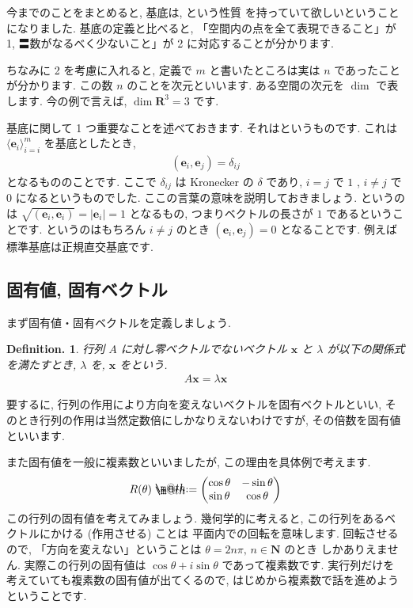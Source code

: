\documentclass[openany, a4paper, oneside]{book}
\makeatletter
\newcommand*{\defeq}{\mathrel{\rlap{%
\raisebox{0.3ex}{$\m@th\cdot$}}%
\raisebox{-0.3ex}{$\m@th\cdot$}}%
=}
\theoremstyle{break}
\theoremstyle{breakdefn}
\newtheorem{defn}[thm]{Definition.}
\makeatother
\begin{document}
今までのことをまとめると, 基底は, という性質
を持っていて欲しいということになりました. 基底の定義と比べると, 「空間内の点を全て表現できること」が 1,
〓数がなるべく少ないこと」が 2 に対応することが分かります.

ちなみに 2 を考慮に入れると, 定義で $m$ と書いたところは実は $n$ であったことが分かります.
この数 $n$ のことを次元といいます.
ある空間の次元を $\dim$ で表します. 今の例で言えば,  $\dim \bm{R}^3 =3$ です.

基底に関して 1 つ重要なことを述べておきます. それはというものです.
これは $\langle \bm{e}_{i} \rangle_{i=i}^m$ を基底としたとき,
    \begin{align}
        (\bm{e}_{i},\bm{e}_{j}) = \delta _{ij}
    \end{align}
となるもののことです. ここで $\delta _{ij}$ は Kronecker の $\delta$ であり,  $i=j$ で $1$ ,  $i \not = j$ で $0$ になるというものでした.
ここの言葉の意味を説明しておきましょう. というのは $\sqrt{(\bm{e}_{i},\bm{e}_{i})}=\mid \bm{e}_{i} \mid = 1$
となるもの, つまりベクトルの長さが $1$ であるということです. というのはもちろん $i\not = j$ のとき
 $(\bm{e}_{i},\bm{e}_{j})=0$ となることです. 例えば標準基底は正規直交基底です.
\subsection{固有値, 固有ベクトル \label{eigen}}
\label{sec-4-3-2-7}

まず固有値・固有ベクトルを定義しましょう.
    \begin{defn}行列 $A$ に対し零ベクトルでないベクトル $\bm{x}$ と $\lambda $
が以下の関係式を満たすとき,  $\lambda$ を,
 $\bm{x}$ をという.
    \begin{align}
        A \bm{x} = \lambda \bm{x}
    \end{align}
    \end{defn}
要するに, 行列の作用により方向を変えないベクトルを固有ベクトルといい,
そのとき行列の作用は当然定数倍にしかなりえないわけですが, その倍数を固有値といいます.

また固有値を一般に複素数といいましたが, この理由を具体例で考えます.
    \begin{align}
        R (\theta ) \defeq      \begin{pmatrix} \cos \theta & - \sin \theta \\
                        \sin \theta & \cos \theta
        \end{pmatrix}
    \end{align}
この行列の固有値を考えてみましょう. 幾何学的に考えると, この行列をあるベクトルにかける (作用させる) ことは
平面内での回転を意味します. 回転させるので, 「方向を変えない」ということは $\theta = 2n \pi , \, n \in \bm{N}$ のとき
しかありえません. 実際この行列の固有値は $\cos \theta + i \sin \theta$ であって複素数です.
実行列だけを考えていても複素数の固有値が出てくるので, はじめから複素数で話を進めようということです.
\end{document}
